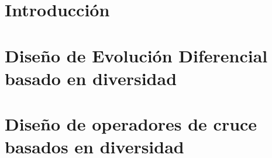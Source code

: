 


\section{Introducción}
\label{sec:Introduction}


%

\section{Diseño de Evolución Diferencial basado en diversidad}
\label{sec:ED}


\section{Diseño de operadores de cruce basados en diversidad}
\label{sec:Operadores}

%
%

